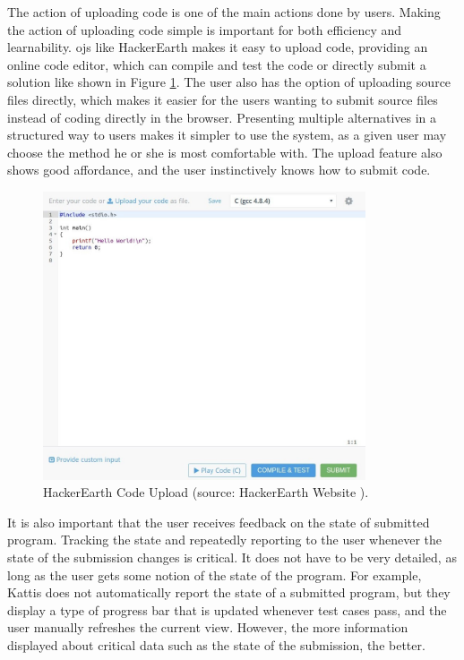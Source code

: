 The action of uploading code is one of the main actions done by users. Making the action of uploading code simple is important for both efficiency and learnability. \glspl{oj} like HackerEarth makes it easy to upload code, providing an online code editor, which can compile and test the code or directly submit a solution like shown in Figure \ref{fig:hackerearth-upload}. The user also has the option of uploading source files directly, which makes it easier for the users wanting to submit source files instead of coding directly in the browser. Presenting multiple alternatives in a structured way to users makes it simpler to use the system, as a given user may choose the method he or she is most comfortable with. The upload feature also shows good affordance, and the user instinctively knows how to submit code. \\

\begin{figure}
    \centering
    \includegraphics[width=0.85\textwidth]{figs/hackerearth_upload.jpg}
    \caption[HackerEarth Code Upload.]{HackerEarth Code Upload (source: HackerEarth Website \cite{HACKEREARTH}).}
    \label{fig:hackerearth-upload}
\end{figure}

It is also important that the user receives feedback on the state of submitted program. Tracking the state and repeatedly reporting to the user whenever the state of the submission changes is critical. It does not have to be very detailed, as long as the user gets some notion of the state of the program. For example, Kattis does not automatically report the state of a submitted program, but they display a type of progress bar that is updated whenever test cases pass, and the user manually refreshes the current view. However, the more information displayed about critical data such as the state of the submission, the better. \\

